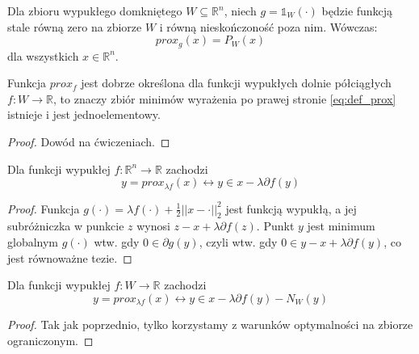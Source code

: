 \documentclass[10pt,a4paper,draft]{report}
\begin{document}
\begin{theorem}
Dla zbioru wypukłego domkniętego $W \subseteq \mathbb{R}^n$, niech $g = \mathds{1}_W(\cdot)$ będzie funkcją stale równą zero na zbiorze $W$ i równą nieskończoność poza nim. Wówczas:
\[
prox_g(x) = P_W(x)
\]
dla wszystkich $x \in \mathbb{R}^n$.
\end{theorem} 

\begin{theorem}
Funkcja $prox_f$ jest dobrze określona dla funkcji wypukłych dolnie półciągłych $f : W \rightarrow \mathbb{R}$, to znaczy zbiór minimów wyrażenia po prawej stronie \ref{eq:def_prox} istnieje i jest jednoelementowy. 
\end{theorem}
\begin{proof}
Dowód na ćwiczeniach.
\end{proof}

\begin{theorem}
Dla funkcji wypukłej $f : \mathbb{R}^n \rightarrow \mathbb{R}$ zachodzi 
\[
y = prox_{\lambda f}(x) \leftrightarrow y \in x - \lambda \partial f(y)
\]
\end{theorem}
\begin{proof}
Funkcja $g(\cdot) = \lambda f(\cdot) + \frac{1}{2} ||x - \cdot||_2^2$ jest funkcją wypukłą, a jej subróżniczka w punkcie $z$ wynosi $z - x + \lambda \partial f(z)$. Punkt $y$ jest minimum globalnym $g(\cdot)$ wtw. gdy $0 \in \partial g (y)$, czyli wtw. gdy $0 \in y - x + \lambda \partial f(y)$, co jest równoważne tezie.
\end{proof}
\begin{theorem}
Dla funkcji wypukłej $f : W \rightarrow \mathbb{R}$ zachodzi 
\[
y = prox_{\lambda f}(x) \leftrightarrow y \in x - \lambda \partial f(y) - N_W(y)
\]
\end{theorem}
\begin{proof}
Tak jak poprzednio, tylko korzystamy z warunków optymalności na zbiorze ograniczonym.
\end{proof}
\end{document}
